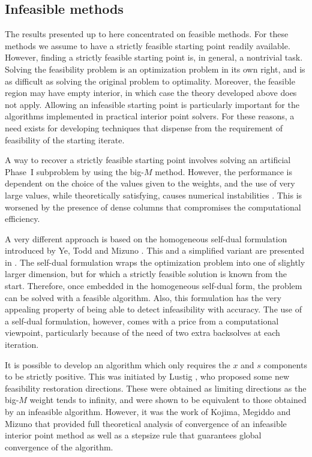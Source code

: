 %
%
\subsection{Infeasible methods}
\label{sec:InfeasibleMethods}

The results presented up to here concentrated on feasible methods. 
For these methods we assume to have a strictly feasible starting point
readily available.
However, finding a strictly feasible starting point is, 
in general, a nontrivial task.
Solving the feasibility problem is an optimization problem in its
own right, and is as difficult as solving the original problem
to optimality.
Moreover, the feasible region may have empty interior,
in which case the theory developed above does not apply.
Allowing an infeasible starting point is particularly important
for the algorithms implemented in practical interior point solvers.
For these reasons, a need exists for developing techniques
that dispense from the requirement of feasibility of the 
starting iterate.

A way to recover a strictly feasible starting point involves 
solving an artificial Phase~I subproblem by using 
the big-$M$ method. However, the performance is dependent on 
the choice of the values given to the weights, and the use
of very large values, while theoretically satisfying,
causes numerical instabilities \cite{Lustig91}.
This is worsened 
by the presence of dense columns that compromises the 
computational efficiency. 

A very different approach is based on the homogeneous 
self-dual formulation introduced by Ye, Todd and Mizuno
\cite{YeToddMizuno94}.
This and a simplified variant are presented in \cite[ch.~9]{ipm:Wright97}.
The self-dual formulation wraps the optimization problem into one 
of slightly larger dimension, but for which a strictly feasible solution
is known from the start.
Therefore, once embedded in the homogeneous self-dual form,
the problem can be solved with a feasible algorithm.
Also, this formulation has the very
appealing property of being able to detect infeasibility
with accuracy.
The use of a self-dual formulation, however, comes with a price from a
computational viewpoint, particularly because of the need of
two extra backsolves at each iteration.

It is possible to develop an algorithm which only requires 
the $x$ and $s$ components to be strictly positive. 
This was initiated by Lustig \cite{Lustig91}, who proposed some
new feasibility restoration directions.
These were obtained as limiting directions as the big-$M$
weight tends to infinity, and were shown to be equivalent
to those obtained by an infeasible algorithm.
However, it was the work of Kojima, Megiddo and Mizuno 
\cite{KojimaMegiddoMizuno}
that provided full theoretical analysis of convergence of
an infeasible interior point method as well as
a stepsize rule that guarantees global convergence of the algorithm.

